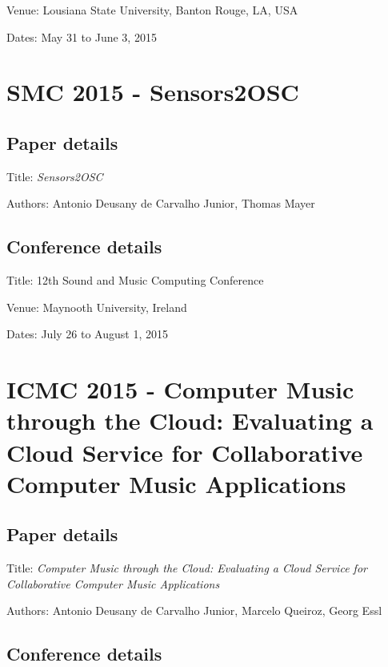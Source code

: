 Venue: Lousiana State University, Banton Rouge, LA, USA

Dates: May 31 to June 3, 2015



\section{SMC 2015 - Sensors2OSC}
\label{ape:papersmc2015}

\subsection*{Paper details}

Title: \textit{Sensors2OSC}

Authors: Antonio Deusany de Carvalho Junior, Thomas Mayer

\subsection*{Conference details}

Title: 12th Sound and Music Computing Conference

Venue: Maynooth University, Ireland

Dates: July 26 to August 1, 2015



\section{ICMC 2015 - Computer Music through the Cloud: Evaluating a Cloud Service for Collaborative Computer Music Applications}
\label{ape:papericmc2015}

\subsection*{Paper details}

Title: \textit{Computer Music through the Cloud: Evaluating a Cloud Service for Collaborative Computer Music Applications}

Authors: Antonio Deusany de Carvalho Junior, Marcelo Queiroz, Georg Essl

\subsection*{Conference details}

